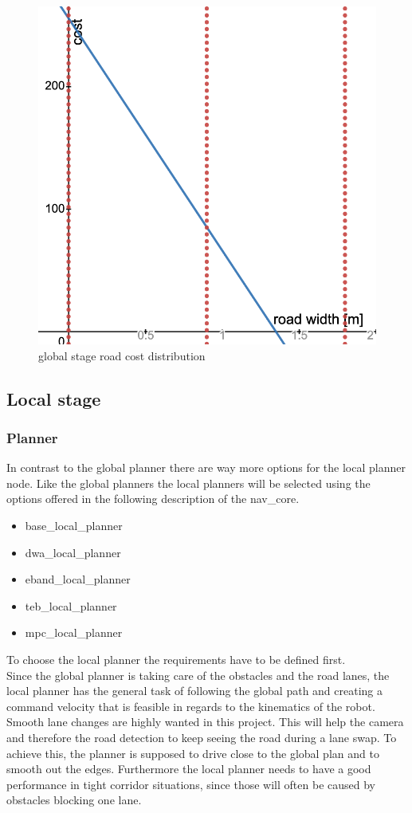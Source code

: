 \begin{figure}[H]
	\centering
	\includegraphics[width=.5\textwidth]{Pictures/global stage cost distro}
	\caption{global stage road cost distribution}
	\label{globalcostdistre}
\end{figure}

\subsection{Local stage}
\subsubsection{Planner}
In contrast to the global planner there are way more options for the local planner node. Like the global planners the local planners will be selected using the options offered in the following description of the nav\_core\cite{navcore}.

\begin{itemize}
	\item base\_local\_planner
	\item dwa\_local\_planner
	\item eband\_local\_planner
	\item teb\_local\_planner
	\item mpc\_local\_planner
\end{itemize}

To choose the local planner the requirements have to be defined first.\\

Since the global planner is taking care of the obstacles and the road lanes, the local planner has the general task of following the global path and creating a command velocity that is feasible in regards to the kinematics of the robot.\\

Smooth lane changes are highly wanted in this project. This will help the camera and therefore the road detection to keep seeing the road during a lane swap. To achieve this, the planner is supposed to drive close to the global plan and to smooth out the edges.
Furthermore the local planner needs to have a good performance in tight corridor situations, since those will often be caused by obstacles blocking one lane.\\

